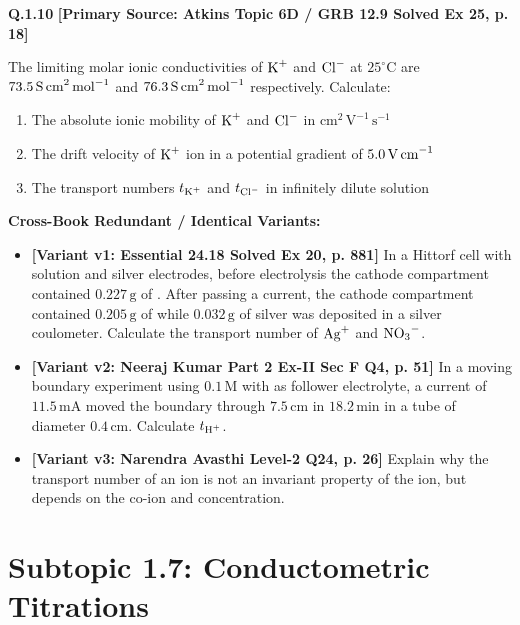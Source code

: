 \begin{problembox}
\textbf{Q.1.10} \hfill \textbf{[Primary Source: Atkins Topic 6D / GRB  12.9 Solved Ex 25, p. 18]}
\label{q:qb-c1-10}

The limiting molar ionic conductivities of $\ce{K+}$ and $\ce{Cl-}$ at $25^\circ\text{C}$ are $73.5\,\text{S\,cm}^2\,\text{mol}^{-1}$ and $76.3\,\text{S\,cm}^2\,\text{mol}^{-1}$ respectively. Calculate:
\begin{enumerate}[label=(\alph*)]
    \item The absolute ionic mobility of $\ce{K+}$ and $\ce{Cl-}$ in $\text{cm}^2\,\text{V}^{-1}\,\text{s}^{-1}$
    \item The drift velocity of $\ce{K+}$ ion in a potential gradient of $5.0\,\text{V\,cm}^{-1}$
    \item The transport numbers $t_{\ce{K+}}$ and $t_{\ce{Cl-}}$ in infinitely dilute  solution
\end{enumerate}

\tcbline
\textbf{\color{accentamber}Cross-Book Redundant / Identical Variants:}
\begin{itemize}[leftmargin=*,itemsep=2pt]
    \item \textbf{[Variant v1: Essential  24.18 Solved Ex 20, p. 881]} In a Hittorf cell with  solution and silver electrodes, before electrolysis the cathode compartment contained $0.227\,\text{g}$ of . After passing a current, the cathode compartment contained $0.205\,\text{g}$ of  while $0.032\,\text{g}$ of silver was deposited in a silver coulometer. Calculate the transport number of $\ce{Ag+}$ and $\ce{NO3-}$.
    \item \textbf{[Variant v2: Neeraj Kumar Part 2 Ex-II Sec F Q4, p. 51]} In a moving boundary experiment using $0.1\,\text{M}$  with  as follower electrolyte, a current of $11.5\,\text{mA}$ moved the boundary through $7.5\,\text{cm}$ in $18.2\,\text{min}$ in a tube of diameter $0.4\,\text{cm}$. Calculate $t_{\ce{H+}}$.
    \item \textbf{[Variant v3: Narendra Avasthi Level-2 Q24, p. 26]} Explain why the transport number of an ion is not an invariant property of the ion, but depends on the co-ion and concentration.
\end{itemize}
\end{problembox}

\section{Subtopic 1.7: Conductometric Titrations}

